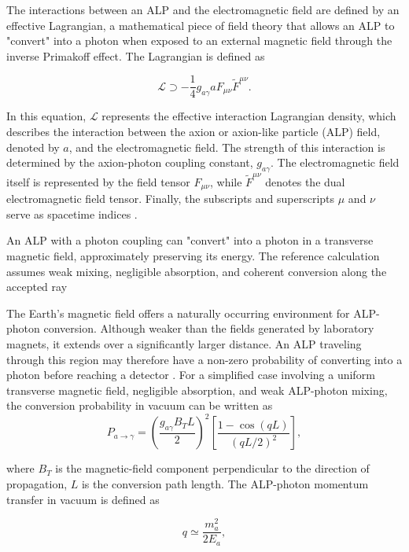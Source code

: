 \documentclass[10pt,letterpaper,twocolumn]{article}
\begin{document}
The interactions between an ALP and the electromagnetic field are defined by an effective Lagrangian, a mathematical piece of field theory that allows an ALP to "convert" into a photon when exposed to an external magnetic field through the inverse Primakoff effect. The Lagrangian is defined as 

\begin{equation}
\mathcal{L} \supset -\frac{1}{4} g_{a\gamma} a F_{\mu\nu} \tilde{F}^{\mu\nu}.
\end{equation}

In this equation, $\mathcal{L}$ represents the effective interaction Lagrangian density, which describes the interaction between the axion or axion-like particle (ALP) field, denoted by $a$, and the electromagnetic field. The strength of this interaction is determined by the axion-photon coupling constant, $g_{a\gamma}$. The electromagnetic field itself is represented by the field tensor $F_{\mu\nu}$, while $\tilde{F}^{\mu\nu}$ denotes the dual electromagnetic field tensor. Finally, the subscripts and superscripts $\mu$ and $\nu$ serve as spacetime indices \cite{chakraborti2026probing}\textbf{}. 

 An ALP with a photon coupling can "convert" into a photon in a transverse magnetic field, approximately preserving its energy. The reference calculation assumes weak mixing, negligible absorption, and coherent conversion along the accepted ray\cite{yamamoto2020alp,davoudiasl2008gecosax}

 The Earth's magnetic field offers a naturally occurring environment for ALP-photon conversion. Although weaker than the fields generated by laboratory magnets, it extends over a significantly larger distance. An ALP traveling through this region may therefore have a non-zero probability of converting into a photon before reaching a detector \cite{davoudiasl2008gecosax}. For a simplified case involving a uniform transverse magnetic field, negligible absorption, and weak ALP-photon mixing, the conversion probability in vacuum can be written as
 \begin{equation}
P_{a\rightarrow\gamma}
=
\left(\frac{g_{a\gamma}B_TL}{2}\right)^2
\left[
\frac{1-\cos(qL)}{(qL/2)^2}
\right],
\end{equation}

where $B_T$ is the magnetic-field component perpendicular to the direction of propagation, $L$ is the conversion path length. The ALP-photon momentum transfer in vacuum is defined as 

\begin{equation}
q \simeq \frac{m_a^2}{2E_a},
\end{equation}
\end{document}
